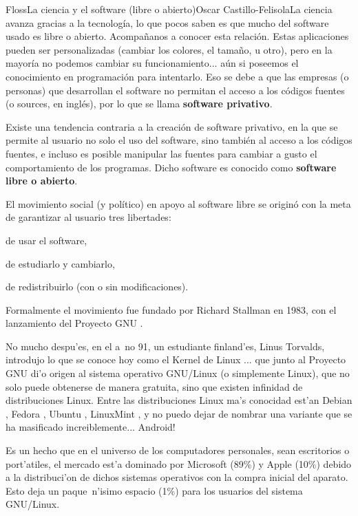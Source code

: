 \begin{article}[2]{Floss}{La ciencia y el software (libre o abierto)}{Oscar Castillo-Felisola}{La ciencia avanza gracias a la tecnolog\'ia, lo que pocos saben es que mucho del software usado es libre o abierto. Acompa\~nanos a conocer esta relaci\'on.}
Estas aplicaciones pueden ser personalizadas (cambiar los colores, el tama\~no, u otro), pero en la mayor\'ia no podemos cambiar su funcionamiento... a\'un si poseemos el conocimiento en programaci\'on para intentarlo. Eso se debe a que las empresas (o personas) que desarrollan el software no permitan el acceso a los c\'odigos fuentes (o sources, en ingl\'es), por lo que se llama {\bf software privativo}.

Existe una tendencia contraria a la creaci\'on de software privativo, en la que se permite al usuario no solo el uso del software, sino tambi\'en al acceso a los c\'odigos fuentes, e incluso es posible manipular las fuentes para cambiar a gusto el comportamiento de los programas. Dicho software es conocido como {\bf software libre o abierto}.



El movimiento social (y pol\'itico)  en apoyo al software libre se origin\'o con la meta de garantizar al usuario tres libertades:
\begin{Auflistung}
\item de usar el software,
\item de estudiarlo y cambiarlo,
\item de redistribuirlo (con o sin modificaciones).
\end{Auflistung}
Formalmente el movimiento fue fundado por Richard Stallman en 1983, con el lanzamiento del Proyecto GNU .

No mucho despu'es, en el  a~no 91, un estudiante finland'es, Linus Torvalds, introdujo lo que se conoce hoy como el Kernel de Linux ... que junto al Proyecto GNU di'o origen al sistema operativo GNU/Linux (o simplemente Linux), que no solo puede obtenerse de manera gratuita, sino que existen infinidad de distribuciones Linux. Entre las distribuciones Linux ma's conocidad est'an Debian , Fedora , Ubuntu , LinuxMint , y no puedo dejar de nombrar una variante que se ha masificado increiblemente... Android! 






Es un hecho que en el universo de los computadores personales, sean escritorios o port'atiles, el mercado est'a dominado por Microsoft (89\%) y Apple (10\%) debido a la distribuci'on de dichos sistemas operativos con la compra inicial del aparato. Esto deja un paque~n'isimo espacio (1\%) para los usuarios del sistema GNU/Linux.


\end{article}
